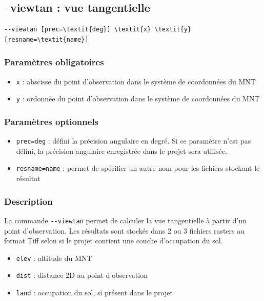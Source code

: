 \documentclass{report}
\begin{document}
\subsection{--viewtan : vue tangentielle}
\begin{Verbatim}[commandchars=\\\{\}]
--viewtan [prec=\textit{deg}] \textit{x} \textit{y} [resname=\textit{name}]
\end{Verbatim}

\subsubsection{Paramètres obligatoires}
\begin{itemize}
	\item \verb|x| : abscisse du point d'observation dans le système de coordonnées du MNT
	\item \verb|y| : ordonnée du point d'observation dans le système de coordonnées du MNT
\end{itemize}

\subsubsection{Paramètres optionnels}
\begin{itemize}
	\item \verb|prec=deg| : défini la précision angulaire en degré. Si ce paramètre n'est pas défini, la précision angulaire enregistrée dans le projet sera utilisée.
	\item \verb|resname=name| : permet de spécifier un autre nom pour les fichiers stockant le résultat
\end{itemize}

\subsubsection{Description}
La commande \verb|--viewtan| permet de calculer la vue tangentielle à partir d'un point d'observation. Les résultats sont stockés dans 2 ou 3 fichiers rasters au format Tiff selon si le projet contient une couche d'occupation du sol. 
\begin{itemize}
	\item \verb|elev| : altitude du MNT
	\item \verb|dist| : distance 2D au point d'observation
	\item \verb|land| : occupation du sol, si présent dans le projet
\end{itemize}
\end{document}
